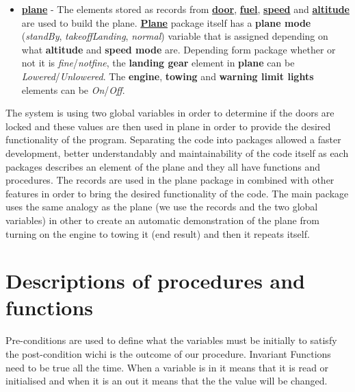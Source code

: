 \documentclass{llncs}
\begin{document}
\begin{itemize}
\item \textbf{\underline{plane}} - The elements stored as records from \textbf{\underline{door}}, \textbf{\underline{fuel}}, \textbf{\underline{speed}} and \textbf{\underline{altitude}} are used to build the plane. \textbf{\underline{Plane}} package itself has a \textcolor{BlueViridis}{\textbf{plane mode}} (\textit{standBy}, \textit{takeoffLanding}, \textit{normal}) variable that is assigned depending on what \textcolor{BlueViridis}{\textbf{altitude}} and \textcolor{BlueViridis}{\textbf{speed mode}} are. Depending form package whether or not it is \textit{fine}/\textit{notfine}, the \textcolor{BlueViridis}{\textbf{landing gear}} element in \textcolor{BlueViridis}{\textbf{plane}} can be \textit{Lowered}/\textit{Unlowered}. The \textcolor{BlueViridis}{\textbf{engine}}, \textcolor{BlueViridis}{\textbf{towing}} and \textcolor{BlueViridis}{\textbf{warning limit lights}} elements can be \textit{On}/\textit{Off}.
\end{itemize}

The system is using two global variables in order to determine if the doors are locked and these values are then used in plane in order to provide the desired functionality of the program. 
Separating the code into packages allowed a faster development, better understandably and maintainability of the code itself as each packages describes an element of the plane and they all have functions and procedures. 
The records are used in the plane package in combined with other features in order to bring the desired functionality of the code. 
The main package uses the same analogy as the plane (we use the records and the two global variables) in other to create an automatic demonstration of the plane from turning on the engine to towing it (end result) and then it repeats itself.

\section{Descriptions of procedures and functions}
Pre-conditions are used to define what the variables must be initially to satisfy the post-condition wichi is the outcome of our procedure. Invariant Functions need to be true all the time. When a variable is in it means that it is read or initialised and when it is an out it means that the the value will be changed. 
\end{document}
